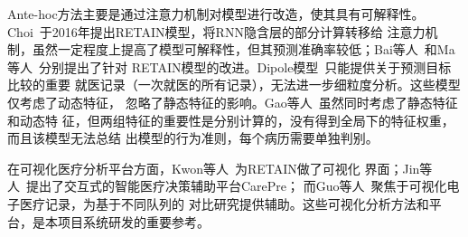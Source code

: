 Ante-hoc方法主要是通过注意力机制对模型进行改造，使其具有可解释性。
Choi~于2016年提出RETAIN模型，将RNN隐含层的部分计算转移给
注意力机制，虽然一定程度上提高了模型可解释性，但其预测准确率较低；Bai等人~和Ma等人~分别提出了针对
RETAIN模型的改进。Dipole模型~只能提供关于预测目标比较的重要
就医记录（一次就医的所有记录），无法进一步细粒度分析。这些模型仅考虑了动态特征，
忽略了静态特征的影响。Gao等人~虽然同时考虑了静态特征和动态特
征，但两组特征的重要性是分别计算的，没有得到全局下的特征权重，而且该模型无法总结
出模型的行为准则，每个病历需要单独判别。

在可视化医疗分析平台方面，Kwon等人~为RETAIN做了可视化
界面；Jin等人~提出了交互式的智能医疗决策辅助平台CarePre；
而Guo等人~聚焦于可视化电子医疗记录，为基于不同队列的
对比研究提供辅助。这些可视化分析方法和平台，是本项目系统研发的重要参考。



{}

\begin{spacing}{1.3} %
	 \songti   
	
	  
	\vspace{11bp}
\end{spacing}